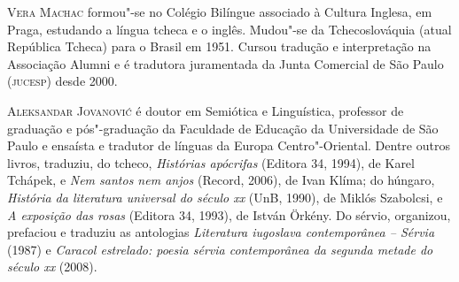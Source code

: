 {\noindent\textsc{Vera Machac} formou"-se no Colégio Bilíngue associado à Cultura Inglesa, em Praga, estudando a língua tcheca e o inglês.  
Mudou"-se da Tchecoslováquia (atual República Tcheca) para o Brasil em 1951. Cursou tradução e interpretação na Associação Alumni 
e é tradutora juramentada da Junta Comercial de São Paulo (\textsc{jucesp}) desde 2000. 

\noindent\textsc{Aleksandar Jovanović} é doutor em Semiótica e Linguística, 
professor de graduação e pós"-graduação da Faculdade de Educação da 
Universidade de São Paulo e ensaísta e tradutor de línguas 
da Europa Centro"-Oriental.  Dentre outros livros, traduziu, do tcheco, \textit{Histórias apócrifas} 
(Editora 34, 1994), de Karel Tchápek, e \textit{Nem santos nem anjos} (Record, 2006), de Ivan Klíma; do húngaro, 
\textit{História da literatura universal do século xx} (UnB, 1990), de Miklós Szabolcsi, 
e \textit{A exposição das rosas} (Editora 34, 1993), de István Örkény. Do sérvio, 
organizou, prefaciou e traduziu as antologias \textit{Literatura 
iugoslava contemporânea -- Sérvia} (1987) e \textit{Caracol estrelado: poesia sérvia contemporânea da segunda metade do século xx} (2008).


}


